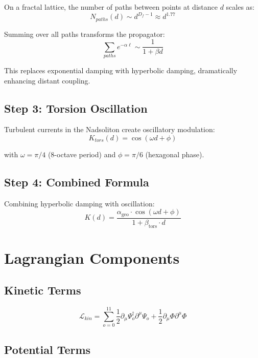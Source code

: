 \documentclass[11pt, a4paper]{article}
\theoremstyle{remark}
\newcommand{\alphageo}{\alpha_{\text{geo}}}
\newcommand{\betators}{\beta_{\text{tors}}}
\begin{document}
On a fractal lattice, the number of paths between points at distance $d$ scales as:
\begin{equation}
N_{paths}(d) \sim d^{D_f - 1} \approx d^{1.77}
\end{equation}

Summing over all paths transforms the propagator:
\begin{equation}
\sum_{paths} e^{-\alpha \ell} \sim \frac{1}{1 + \beta d}
\end{equation}

This replaces exponential damping with hyperbolic damping, dramatically enhancing distant coupling.

\subsection{Step 3: Torsion Oscillation}

Turbulent currents in the Nadsoliton create oscillatory modulation:
\begin{equation}
K_{tors}(d) = \cos(\omega d + \phi)
\end{equation}

with $\omega = \pi/4$ (8-octave period) and $\phi = \pi/6$ (hexagonal phase).

\subsection{Step 4: Combined Formula}

Combining hyperbolic damping with oscillation:
\begin{equation}
\boxed{K(d) = \frac{\alphageo \cdot \cos(\omega d + \phi)}{1 + \betators \cdot d}}
\end{equation}

\section{Lagrangian Components}

\subsection{Kinetic Terms}

\begin{equation}
\mathcal{L}_{kin} = \sum_{o=0}^{11} \frac{1}{2} \partial_\mu \Psi_o^\dagger \partial^\mu \Psi_o + \frac{1}{2} \partial_\mu \Phi \partial^\mu \Phi
\end{equation}

\subsection{Potential Terms}
\end{document}
